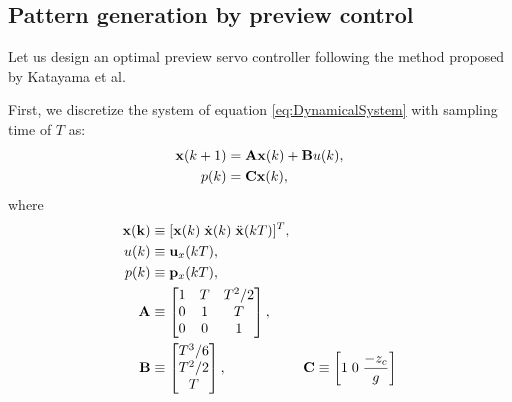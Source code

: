 \subsection{Pattern generation by preview control}
Let us design an optimal preview servo controller following the method proposed
by Katayama et al.
\par
First, we discretize the system of equation \ref{eq:DynamicalSystem} with sampling
 time of $T$ as:
\begin{equation}
\begin{aligned}
{\bf x}(k+1) &= {\bf Ax} (k) + {\bf B}u(k),\\
p(k) &= {\bf Cx}(k),
\end{aligned}
\label{eq:DiscreteDS}
\end{equation}
where
\begin{equation}
\begin{aligned}
\bf{x}(k) & \equiv [ {\bf x}(k)\; \dot{\bf x}(k)\; \ddot{\bf x}(kT) ]^T , \\
u(k) & \equiv {\bf u}_x(kT) , \\
p(k) & \equiv {\bf p}_x(kT) , \\
{\bf A} & \equiv
\left[
\begin{matrix}
1 & T & T^2/2 \\
0 & 1 & T \\
0 & 0 & 1
\end{matrix}
\right],\\
{\bf B} & \equiv
\left[
\begin{matrix}
T^3/6 \\
T^2/2 \\
T
\end{matrix}
\right],
&
{\bf C}  \equiv
\left[
1 \; 0 \; \frac{-z_c}{g}
\right]
\end{aligned}
\end{equation}
\clearpage
